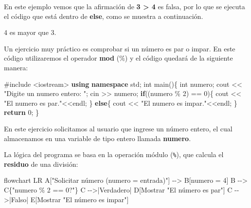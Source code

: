 \documentclass[
  11pt,
  a4paper,
  DIV=11,
  numbers=noendperiod]{scrreprt}
\newenvironment{Shaded}{\begin{snugshade}}{\end{snugshade}}
\newcommand{\ControlFlowTok}[1]{\textcolor[rgb]{0.00,0.23,0.31}{\textbf{#1}}}
\newcommand{\DataTypeTok}[1]{\textcolor[rgb]{0.68,0.00,0.00}{#1}}
\newcommand{\DecValTok}[1]{\textcolor[rgb]{0.68,0.00,0.00}{#1}}
\newcommand{\ImportTok}[1]{\textcolor[rgb]{0.00,0.46,0.62}{#1}}
\newcommand{\KeywordTok}[1]{\textcolor[rgb]{0.00,0.23,0.31}{\textbf{#1}}}
\newcommand{\NormalTok}[1]{\textcolor[rgb]{0.00,0.23,0.31}{#1}}
\newcommand{\OperatorTok}[1]{\textcolor[rgb]{0.37,0.37,0.37}{#1}}
\newcommand{\PreprocessorTok}[1]{\textcolor[rgb]{0.68,0.00,0.00}{#1}}
\newcommand{\StringTok}[1]{\textcolor[rgb]{0.13,0.47,0.30}{#1}}
\begin{document}
En este ejemplo vemos que la afirmación de \textbf{3 \textgreater{} 4}
es falsa, por lo que se ejecuta el código que está dentro de
\textbf{else}, como se muestra a continuación.

\begin{tcolorbox}[custombox]
4 es mayor que 3.
\end{tcolorbox}

Un ejercicio muy práctico es comprobar si un número es par o impar. En
este código utilizaremos el operador \textbf{mod} (\%) y el código
quedará de la siguiente manera:

\begin{Shaded}
\begin{Highlighting}[]
\PreprocessorTok{\#include }\ImportTok{\textless{}iostream\textgreater{}}
\KeywordTok{using} \KeywordTok{namespace}\NormalTok{ std}\OperatorTok{;}
\DataTypeTok{int}\NormalTok{ main}\OperatorTok{()\{}
    \DataTypeTok{int}\NormalTok{ numero}\OperatorTok{;}
\NormalTok{    cout }\OperatorTok{\textless{}\textless{}} \StringTok{"Digite un numero entero: "}\OperatorTok{;}
\NormalTok{    cin }\OperatorTok{\textgreater{}\textgreater{}}\NormalTok{ numero}\OperatorTok{;}
    \ControlFlowTok{if}\OperatorTok{((}\NormalTok{numero }\OperatorTok{\%} \DecValTok{2}\OperatorTok{)} \OperatorTok{==} \DecValTok{0}\OperatorTok{)\{}
\NormalTok{        cout }\OperatorTok{\textless{}\textless{}} \StringTok{"El numero es par."}\OperatorTok{\textless{}\textless{}}\NormalTok{endl}\OperatorTok{;}
    \OperatorTok{\}}
    \ControlFlowTok{else}\OperatorTok{\{}
\NormalTok{        cout }\OperatorTok{\textless{}\textless{}} \StringTok{"El numero es impar."}\OperatorTok{\textless{}\textless{}}\NormalTok{endl}\OperatorTok{;}
    \OperatorTok{\}}
    \ControlFlowTok{return} \DecValTok{0}\OperatorTok{;}
\OperatorTok{\}}
\end{Highlighting}
\end{Shaded}

En este ejercicio solicitamos al usuario que ingrese un número entero,
el cual almacenamos en una variable de tipo entero llamada
\textbf{numero}.

La lógica del programa se basa en la operación módulo (\texttt{\%}), que
calcula el \textbf{residuo} de una división:

\begin{Shaded}
\begin{Highlighting}[]
\NormalTok{flowchart LR}
\NormalTok{  A["Solicitar número (numero = entrada)"] {-}{-}\textgreater{} B[numero = 4]}
\NormalTok{  B {-}{-}\textgreater{} C\{"numero \% 2 == 0?"\}}
\NormalTok{  C {-}{-}\textgreater{}|Verdadero| D[Mostrar "El número es par"]}
\NormalTok{  C {-}{-}\textgreater{}|Falso| E[Mostrar "El número es impar"]}
\end{Highlighting}
\end{Shaded}
\end{document}
